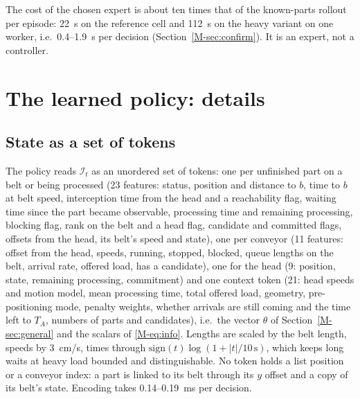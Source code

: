 \documentclass[11pt,a4paper]{article}
\theoremstyle{plain}
\theoremstyle{definition}
\theoremstyle{remark}
\newcommand{\I}{\mathcal I}
\begin{document}
The cost of the chosen expert is about ten times that of the known-parts rollout per
episode: 22~s on the reference cell and 112~s on the heavy variant on one worker, i.e.\
0.4--1.9~s per decision (Section~\ref{M-sec:confirm}). It is an expert, not a controller.

\section{The learned policy: details}\label{sec:policydetails}
\subsection{State as a set of tokens}
The policy reads $\I_t$ as an unordered set of tokens: one per unfinished part on a belt
or being processed (23 features: status, position and distance to $b$, time to $b$ at belt
speed, interception time from the head and a reachability flag, waiting time since the
part became observable, processing time and remaining processing, blocking flag, rank on
the belt and a head flag, candidate and committed flags, offsets from the head, its belt's
speed and state), one per conveyor (11 features: offset from the head, speeds, running,
stopped, blocked, queue lengths on the belt, arrival rate, offered load, has a candidate),
one for the head (9: position, state, remaining processing, commitment) and one context
token (21: head speeds and motion model, mean processing time, total offered load,
geometry, pre-positioning mode, penalty weights, whether arrivals are still coming and the
time left to $T_A$, numbers of parts and candidates), i.e.\ the vector $\theta$ of
Section~\ref{M-sec:general} and the scalars of \eqref{M-eq:info}. Lengths are scaled by the
belt length, speeds by 3~cm/s, times through $\mathrm{sign}(t)\log(1+|t|/10\,\mathrm{s})$,
which keeps long waits at heavy load bounded and distinguishable. No token holds a list
position or a conveyor index: a part is linked to its belt through its $y$ offset and a
copy of its belt's state. Encoding takes 0.14--0.19~ms per decision.
\end{document}
